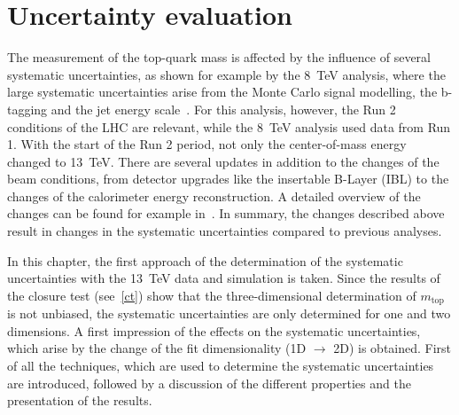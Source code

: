 \chapter{Uncertainty evaluation}
\label{sec:Uns}
The measurement of the top-quark mass is affected by the influence of several systematic uncertainties, as shown for example by the 8~TeV analysis, where the large systematic uncertainties arise from the Monte Carlo signal modelling, the b-tagging and the jet energy scale~\cite{ATLAS-CONF-2017-071}.  For this analysis, however, the Run 2 conditions of the LHC are relevant, while the 8~TeV analysis used data from Run 1. With the start of the Run 2 period, not only the center-of-mass energy  changed to 13~TeV. There are several updates in addition to the changes of the beam conditions, from  detector upgrades like the  insertable B-Layer (IBL) to the changes of the calorimeter energy reconstruction. A detailed overview of the changes can be found for example in~\cite{ATL-PHYS-PUB-2015-015}. In summary, 
the changes described above result in changes in the systematic uncertainties compared to previous analyses. 

In this chapter, the first approach of the determination of  the systematic uncertainties with the 13~TeV data and simulation is taken. 
Since the results of the closure test (see~\cref{ct}) show that the three-dimensional determination of $m_{\text{top}}$ is not unbiased, the systematic uncertainties  are only determined for one and two dimensions. 
 A first impression of the effects on the systematic uncertainties, which arise by the change  of the fit dimensionality  (1D $\rightarrow$ 2D) is obtained.
First of all the techniques, which are used to determine the systematic uncertainties  are introduced, followed by a discussion of the different properties and the presentation of the results.   






